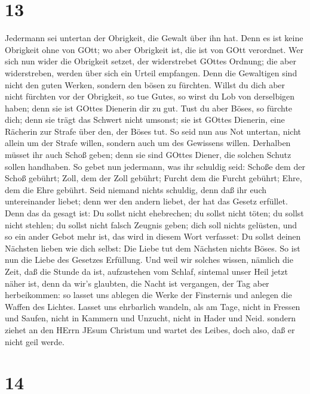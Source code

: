 \hypertarget{section-12}{%
\section{13}\label{section-12}}

 Jedermann sei untertan der Obrigkeit, die Gewalt über ihn
hat. Denn es ist keine Obrigkeit ohne von GOtt; wo aber Obrigkeit ist,
die ist von GOtt verordnet.  Wer sich nun wider die
Obrigkeit setzet, der widerstrebet GOttes Ordnung; die aber
widerstreben, werden über sich ein Urteil empfangen.  Denn
die Gewaltigen sind nicht den guten Werken, sondern den bösen zu
fürchten. Willst du dich aber nicht fürchten vor der Obrigkeit, so tue
Gutes, so wirst du Lob von derselbigen haben;  denn sie ist
GOttes Dienerin dir zu gut. Tust du aber Böses, so fürchte dich; denn
sie trägt das Schwert nicht umsonst; sie ist GOttes Dienerin, eine
Rächerin zur Strafe über den, der Böses tut.  So seid nun
aus Not untertan, nicht allein um der Strafe willen, sondern auch um des
Gewissens willen.  Derhalben müsset ihr auch Schoß geben;
denn sie sind GOttes Diener, die solchen Schutz sollen handhaben.
 So gebet nun jedermann, was ihr schuldig seid: Schoße dem
der Schoß gebührt; Zoll, dem der Zoll gebührt; Furcht dem die Furcht
gebührt; Ehre, dem die Ehre gebührt.  Seid niemand nichts
schuldig, denn daß ihr euch untereinander liebet; denn wer den andern
liebet, der hat das Gesetz erfüllet.  Denn das da gesagt
ist: Du sollst nicht ehebrechen; du sollst nicht töten; du sollst nicht
stehlen; du sollst nicht falsch Zeugnis geben; dich soll nichts
gelüsten, und so ein ander Gebot mehr ist, das wird in diesem Wort
verfasset: Du sollst deinen Nächsten lieben wie dich selbst:
 Die Liebe tut dem Nächsten nichts Böses. So ist nun die
Liebe des Gesetzes Erfüllung.  Und weil wir solches wissen,
nämlich die Zeit, daß die Stunde da ist, aufzustehen vom Schlaf,
sintemal unser Heil jetzt näher ist, denn da wir's glaubten,
 die Nacht ist vergangen, der Tag aber herbeikommen: so
lasset uns ablegen die Werke der Finsternis und anlegen die Waffen des
Lichtes.  Lasset uns ehrbarlich wandeln, als am Tage, nicht
in Fressen und Saufen, nicht in Kammern und Unzucht, nicht in Hader und
Neid.  sondern ziehet an den HErrn JEsum Christum und
wartet des Leibes, doch also, daß er nicht geil werde.

\hypertarget{section-13}{%
\section{14}\label{section-13}}

